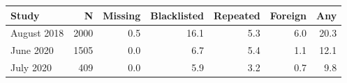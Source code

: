 \begin{tabular}{lrrrrrr}
\toprule
Study & N & Missing & Blacklisted & Repeated & Foreign & Any \\
\midrule
August 2018 & 2000 & 0.5 & 16.1 & 5.3 & 6.0 & 20.3 \\
June 2020 & 1505 & 0.0 & 6.7 & 5.4 & 1.1 & 12.1 \\
July 2020 & 409 & 0.0 & 5.9 & 3.2 & 0.7 & 9.8 \\
\bottomrule
\end{tabular}
